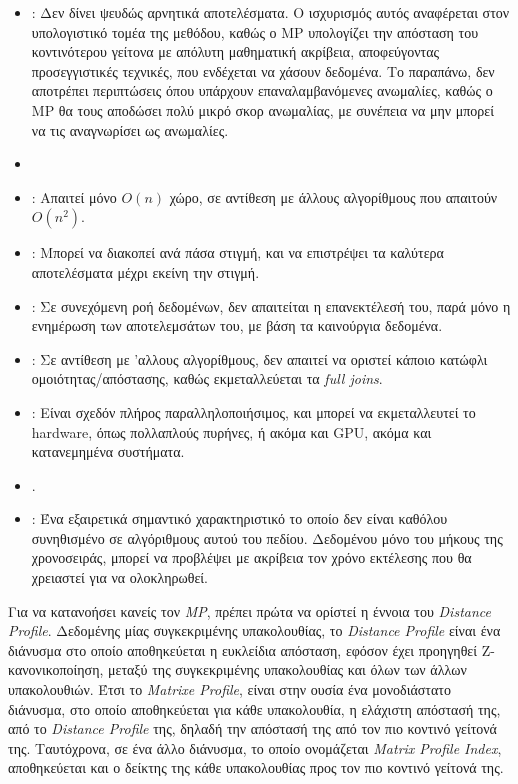 \begin{itemize}
    \item {}: Δεν δίνει ψευδώς αρνητικά αποτελέσματα. Ο ισχυρισμός αυτός αναφέρεται στον υπολογιστικό τομέα της μεθόδου, καθώς ο MP υπολογίζει την απόσταση του κοντινότερου γείτονα με απόλυτη μαθηματική ακρίβεια, αποφεύγοντας προσεγγιστικές τεχνικές, που ενδέχεται να χάσουν δεδομένα. Το παραπάνω, δεν αποτρέπει περιπτώσεις όπου υπάρχουν επαναλαμβανόμενες ανωμαλίες, καθώς ο MP θα τους αποδώσει πολύ μικρό σκορ ανωμαλίας, με συνέπεια να μην μπορεί να τις αναγνωρίσει ως ανωμαλίες.
    \item {}
    \item {}: Απαιτεί μόνο $O(n)$ χώρο, σε αντίθεση με άλλους αλγορίθμους που απαιτούν $O(n^2)$.
    \item {}: Μπορεί να διακοπεί ανά πάσα στιγμή, και να επιστρέψει τα καλύτερα αποτελέσματα μέχρι εκείνη την στιγμή.
    \item {}: Σε συνεχόμενη ροή δεδομένων, δεν απαιτείται η επανεκτέλεσή του, παρά μόνο η ενημέρωση των αποτελεμσάτων του, με βάση τα καινούργια δεδομένα.
    \item {}: Σε αντίθεση με 'αλλους αλγορίθμους, δεν απαιτεί να οριστεί κάποιο κατώφλι ομοιότητας/απόστασης, καθώς εκμεταλλεύεται τα \emph{full joins}.
    \item {}: Είναι σχεδόν πλήρος παραλληλοποιήσιμος, και μπορεί να εκμεταλλευτεί το hardware, όπως πολλαπλούς πυρήνες, ή ακόμα και GPU, ακόμα και κατανεμημένα συστήματα.
    \item {}.
    \item {}: Ένα εξαιρετικά σημαντικό χαρακτηριστικό το οποίο δεν είναι καθόλου συνηθισμένο σε αλγόριθμους αυτού του πεδίου. Δεδομένου μόνο του μήκους της χρονοσειράς, μπορεί να προβλέψει με ακρίβεια τον χρόνο εκτέλεσης που θα χρειαστεί για να ολοκληρωθεί.
\end{itemize}

Για να κατανοήσει κανείς τον \emph{MP}, πρέπει πρώτα να ορίστεί η έννοια του \emph{Distance Profile}. Δεδομένης μίας συγκεκριμένης υπακολουθίας, το \emph{Distance Profile} είναι ένα διάνυσμα στο οποίο αποθηκεύεται η ευκλείδια απόσταση, εφόσον έχει προηγηθεί Ζ-κανονικοποίηση, μεταξύ της συγκεκριμένης υπακολουθίας και όλων των άλλων υπακολουθιών. Έτσι το \emph{Matrixe Profile}, είναι στην ουσία ένα μονοδιάστατο διάνυσμα, στο οποίο αποθηκεύεται για κάθε υπακολουθία, η ελάχιστη απόστασή της, από το \emph{Distance Profile} της, δηλαδή την απόστασή της από τον πιο κοντινό γείτονά της. Ταυτόχρονα, σε ένα άλλο διάνυσμα, το οποίο ονομάζεται \emph{Matrix Profile Index}, αποθηκεύεται και ο δείκτης της κάθε υπακολουθίας προς τον πιο κοντινό γείτονά της.

